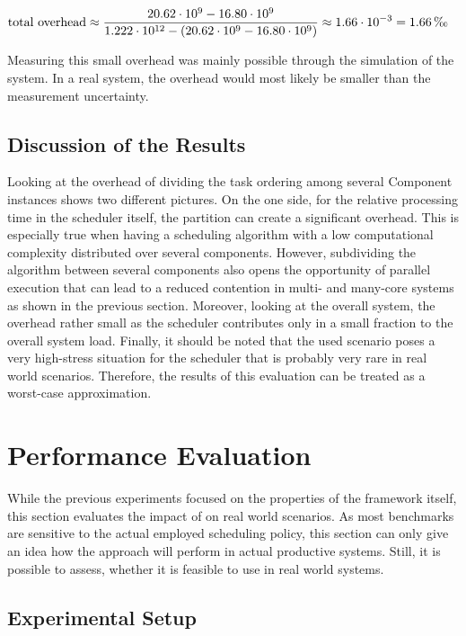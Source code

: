 \begin{center}
	\(\text{total overhead} \approx \displaystyle\frac{20.62 \cdot 10^9 - 16.80 \cdot 10^9}{1.222 \cdot 10^{12} - (20.62 \cdot 10^9 - 16.80 \cdot 10^9)} \approx 1.66 \cdot 10^{-3} = 1.66 \mbox{\,\textperthousand}\)
\end{center}

Measuring this small overhead was mainly possible through the simulation of the system. In a real system, the overhead would most likely be smaller than the measurement uncertainty.

\subsection{Discussion of the Results}

Looking at the overhead of dividing the task ordering among several Component instances shows two different pictures. On the one side, for the relative processing time in the scheduler itself, the partition can create a significant overhead. This is especially true when having a scheduling algorithm with a low computational complexity distributed over several components. However, subdividing the algorithm between several components also opens the opportunity of parallel execution that can lead to a reduced contention in multi- and many-core systems as shown in the previous section. Moreover, looking at the overall system, the overhead rather small as the scheduler contributes only in a small fraction to the overall system load. Finally, it should be noted that the used scenario poses a very high-stress situation for the scheduler that is probably very rare in real world scenarios. Therefore, the results of this evaluation can be treated as a worst-case approximation.

\section{Performance Evaluation}%
\label{sec:studies:nas}

While the previous experiments focused on the properties of the \cobas{} framework itself, this section evaluates the impact of \cobas{} on real world scenarios. As most benchmarks are sensitive to the actual employed scheduling policy, this section can only give an idea how the \cobas{} approach will perform in actual productive systems. Still, it is possible to assess, whether it is feasible to use \cobas{} in real world systems.

\subsection{Experimental Setup}


